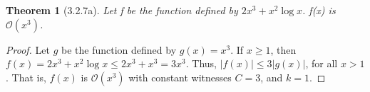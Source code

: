 \documentclass[a4paper, 12pt]{article}
\theoremstyle{plain}
\newtheorem*{theorem*}{Theorem}
\begin{document}
	
	\begin{theorem*}[3.2.7a]
		Let f be the function defined by $2x^{3} + x^{2} \log x$. \newline f(x) is $\mathcal{O}(x^{3})$.
	\end{theorem*}
	
	\begin{proof}
		Let $g$ be the function defined by $g(x) = x^{3}$. If $x \ge 1$, then \newline \newline \indent \indent $f(x) = 2x^{3} + x^{2} \log x \le 2x^{3} + x^{3} = 3x^{3}$.
		\newline
		\newline
		Thus, $|f(x)| \le 3|g(x)|$, for all $x > 1$. That is, 
		$f(x)$ is $\mathcal{O}(x^{3})$ with constant witnesses $C = 3$, and $k = 1$.
	\end{proof}
\end{document}
